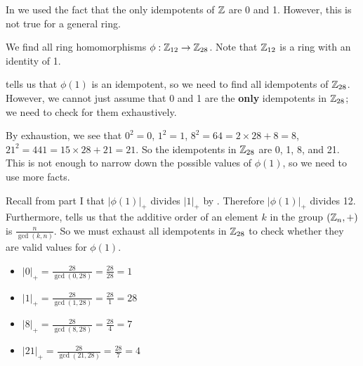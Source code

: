 In  we used the fact that the only idempotents of $\mathbb{Z}$ are 0 and 1. However, this is not true for a general ring.

\begin{example}\label{example-homomorphisms-from-Z12-to-Z28}
    We find all ring homomorphisms $\phi: \mathbb{Z}_{12} \to \mathbb{Z}_{28}$. Note that $\mathbb{Z}_{12}$ is a ring with an identity of 1.

     tells us that $\phi(1)$ is an idempotent, so we need to find all idempotents of $\mathbb{Z}_{28}$. However, we cannot just assume that 0 and 1 are the \textbf{only} idempotents in $\mathbb{Z}_{28}$; we need to check for them exhaustively.

    By exhaustion, we see that $0^2 = 0$, $1^2 = 1$, $8^2 = 64 = 2 \times 28 + 8 = 8$, $21^2 = 441 = 15 \times 28 + 21 = 21$. So the idempotents in $\mathbb{Z}_{28}$ are 0, 1, 8, and 21. This is not enough to narrow down the possible values of $\phi(1)$, so we need to use more facts.

    Recall from part I that $|\phi(1)|_+$ divides $|1|_+$ by . Therefore $|\phi(1)|_+$ divides 12. Furthermore,  tells us that the additive order of an element $k$ in the group $(\mathbb{Z}_n, +)$ is $\frac{n}{\gcd(k,n)}$. So we must exhaust all idempotents in $\mathbb{Z}_{28}$ to check whether they are valid values for $\phi(1)$.


    \begin{multicols}{2}
        \begin{itemize}
            \item $|0|_+ = \frac{28}{\gcd(0,28)} = \frac{28}{28} = 1$
            \item $|1|_+ = \frac{28}{\gcd(1,28)} = \frac{28}{1} = 28$
            \item $|8|_+ = \frac{28}{\gcd(8,28)} = \frac{28}{4} = 7$
            \item $|21|_+ = \frac{28}{\gcd(21,28)} = \frac{28}{7}= 4$
        \end{itemize}
    \end{multicols}


\end{example}
